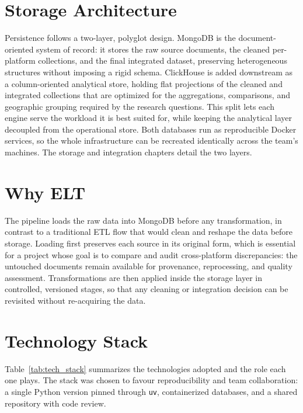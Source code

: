 \section{Storage Architecture}

Persistence follows a two-layer, polyglot design. MongoDB is the document-oriented system of record: it stores the raw source documents, the cleaned per-platform collections, and the final integrated dataset, preserving heterogeneous structures without imposing a rigid schema. ClickHouse is added downstream as a column-oriented analytical store, holding flat projections of the cleaned and integrated collections that are optimized for the aggregations, comparisons, and geographic grouping required by the research questions. This split lets each engine serve the workload it is best suited for, while keeping the analytical layer decoupled from the operational store. Both databases run as reproducible Docker services, so the whole infrastructure can be recreated identically across the team's machines. The storage and integration chapters detail the two layers.

\section{Why ELT}

The pipeline loads the raw data into MongoDB before any transformation, in contrast to a traditional ETL flow that would clean and reshape the data before storage. Loading first preserves each source in its original form, which is essential for a project whose goal is to compare and audit cross-platform discrepancies: the untouched documents remain available for provenance, reprocessing, and quality assessment. Transformations are then applied inside the storage layer in controlled, versioned stages, so that any cleaning or integration decision can be revisited without re-acquiring the data.

\section{Technology Stack}

Table~\ref{tab:tech_stack} summarizes the technologies adopted and the role each one plays. The stack was chosen to favour reproducibility and team collaboration: a single Python version pinned through \texttt{uv}, containerized databases, and a shared repository with code review.

